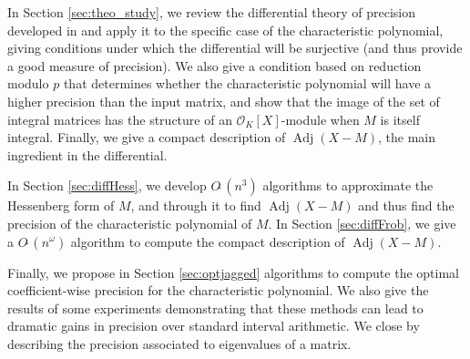\documentclass{sig-alternate-05-2015}
\DeclareMathOperator{\adj}{Adj}
\newcommand{\OK}{\mathcal{O}_K}
\newcommand{\softO}{O\tilde{~}}
\begin{document}
In Section \ref{sec:theo_study}, we review the differential
theory of precision developed in \cite{caruso-roe-vaccon:14a}
and apply it to the specific case of the characteristic polynomial,
giving conditions under which the differential will be surjective
(and thus provide a good measure of precision).  We also give
a condition based on reduction modulo $p$ that determines
whether the characteristic polynomial will have a higher
precision than the input matrix, and show that the image
of the set of integral matrices has the structure of an $\OK[X]$-module
when $M$ is itself integral. Finally, we give a compact description
of $\adj(X-M)$, the main ingredient in the differential.

In Section \ref{sec:diffHess}, we develop $\softO(n^3)$ algorithms to approximate
the Hessenberg form of $M$, and through it to find $\adj(X-M)$ and thus
find the precision of the characteristic polynomial of $M$.  In Section \ref{sec:diffFrob},
we give a $\softO(n^\omega)$ algorithm to compute the compact description of $\adj(X-M)$.

Finally, we propose in Section \ref{sec:optjagged}
algorithms to compute the optimal coefficient-wise precision
for the characteristic polynomial.  We also give the results
of some experiments demonstrating that these methods can lead
to dramatic gains in precision over standard interval arithmetic.
We close by describing the precision associated to
eigenvalues of a matrix.
\end{document}
